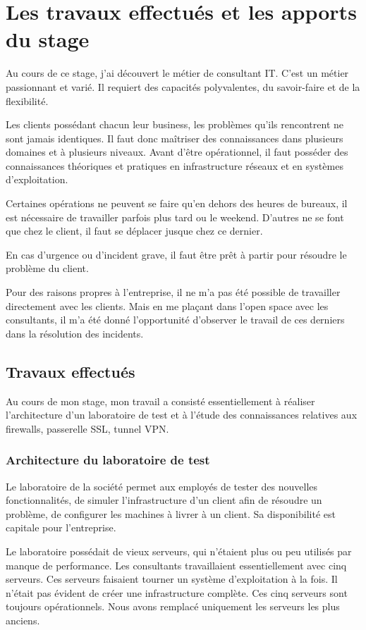 \chapter{Les travaux effectués et les apports du stage}
Au cours de ce stage, j'ai découvert le métier de consultant IT.
C'est un métier passionnant et varié.
Il requiert des capacités polyvalentes, du savoir-faire et de la flexibilité.

Les clients possédant chacun leur business, les problèmes qu'ils rencontrent ne sont jamais identiques.
Il faut donc maîtriser des connaissances dans plusieurs domaines et à plusieurs niveaux.
Avant d'être opérationnel, il faut posséder des connaissances théoriques et pratiques en infrastructure réseaux et en systèmes d'exploitation.

Certaines opérations ne peuvent se faire qu'en dehors des heures de bureaux, il est nécessaire de travailler parfois plus tard ou le weekend. 
D'autres ne se font que chez le client, il faut se déplacer jusque chez ce dernier.

En cas d'urgence ou d'incident grave, il faut être prêt à partir pour résoudre le problème du client. 

Pour des raisons propres à l'entreprise, il ne m'a pas été possible de travailler directement avec les clients.
Mais en me plaçant dans l'open space avec les consultants, il m'a été donné l'opportunité d'observer le travail de ces derniers dans la résolution des incidents.

\section{Travaux effectués}
Au cours de mon stage, mon travail a consisté essentiellement à réaliser l'architecture d'un laboratoire de test et à l'étude des connaissances relatives aux firewalls, passerelle SSL, tunnel VPN.

\subsection{Architecture du laboratoire de test}
Le laboratoire de la société permet aux employés de tester des nouvelles fonctionnalités, de simuler l'infrastructure d'un client afin de résoudre un problème, de configurer les machines à livrer à un client.
Sa disponibilité est capitale pour l'entreprise.

Le laboratoire possédait de vieux serveurs, qui n'étaient plus ou peu utilisés par manque de performance.
Les consultants travaillaient essentiellement avec cinq serveurs.
Ces serveurs faisaient tourner un système d'exploitation à la fois.
Il n'était pas évident de créer une infrastructure complète.
Ces cinq serveurs sont toujours opérationnels.
Nous avons remplacé uniquement les serveurs les plus anciens.


